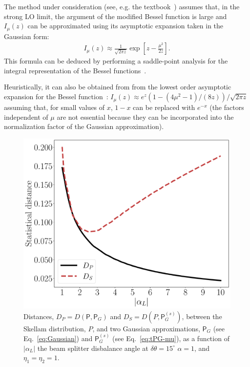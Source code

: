 \documentclass[%
reprint,
superscriptaddress,
 amsmath,amssymb,amsfonts,
 aps,
 pra,
 longbibliography
]{revtex4-2}
\newcommand{\prob}{\mathsf{P}}
\begin{document}
The method under consideration
(see, e.g. the textbook~\cite{Vogel:bk:2006})
assumes that,
in the strong LO limit, the argument of the modified Bessel function is large
and $I_\mu(z)$ can be
approximated using its asymptotic expansion
taken in the Gaussian form:
\begin{align}
  \label{eq:asymp-A}
  I_\mu(z)\approx\frac{1}{\sqrt{2\pi z}}\exp\left[z-\frac{\mu^2}{2 z}\right].
\end{align}
This formula can be deduced by
performing a saddle-point analysis
for the integral representation of
the Bessel functions~\cite{freyberger1993photon}.

Heuristically, it can also be obtained from
from the lowest order asymptotic expansion for
the Bessel function~\cite{NIST:hndbk:2010}:
$I_{\mu}(z)\approx e^z (1-(4\mu^2-1)/(8z))/\sqrt{2\pi z}$
assuming that, for small values of $x$,
$1-x$ can be replaced with $e^{-x}$
(the factors independent of $\mu$ are not essential because they can be incorporated
into the normalization factor of the Gaussian approximation).


\begin{figure}[ht!]
    \centering
    \includegraphics[width=.95\linewidth]{pics/appendix/app_1.pdf}
    \caption{Distances, $D_P=D(\prob,\prob_G)$ and $D_S=D(P,{\prob}_G^{(s)})$, 
      between the Skellam distribution, $P$, and
      two Gaussian approximations, $\prob_G$ (see Eq.~\eqref{eq:Gaussian})
      and  ${\prob}_G^{(s)}$ (see Eq.~\eqref{eq:tPG-mu}), as a function of $|\alpha_L|$
      the beam splitter disbalance angle  at $\delta\theta=15^{\circ}$
$\alpha=1$, and $\eta_1=\eta_2=1$.
    }
    \label{fig:PGPGs-aL}
\end{figure}
\end{document}
